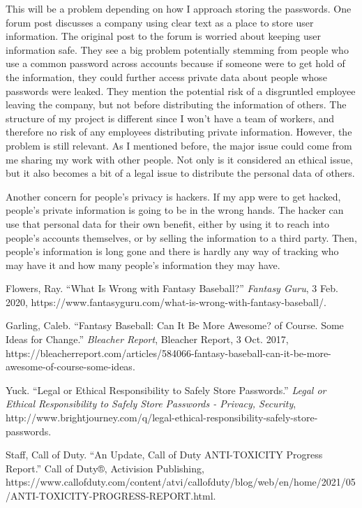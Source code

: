 \documentclass[12pt, twocolumn]{article}
\begin{document}
This will be a problem depending on how I approach storing the passwords. One forum post discusses a company using clear text as a place to store user information. The original post to the forum is worried about keeping user information safe. They see a big problem potentially stemming from people who use a common password across accounts because if someone were to get hold of the information, they could further access private data about people whose passwords were leaked. They mention the potential risk of a disgruntled employee leaving the company, but not before distributing the information of others. The structure of my project is different since I won't have a team of workers, and therefore no risk of any employees distributing private information. However, the problem is still relevant. As I mentioned before, the major issue could come from me sharing my work with other people. Not only is it considered an ethical issue, but it also becomes a bit of a legal issue to distribute the personal data of others. 

Another concern for people's privacy is hackers. If my app were to get hacked, people's private information is going to be in the wrong hands. The hacker can use that personal data for their own benefit, either by using it to reach into people's accounts themselves, or by selling the information to a third party. Then, people's information is long gone and there is hardly any way of tracking who may have it and how many people's information they may have.

\begin{thebibliography}{4}

 Flowers, Ray. “What Is Wrong with Fantasy Baseball?” \emph{Fantasy Guru}, 3 Feb. 2020, https://www.fantasyguru.com/what-is-wrong-with-fantasy-baseball/. 

 Garling, Caleb. “Fantasy Baseball: Can It Be More Awesome? of Course. Some Ideas for Change.” \emph{Bleacher Report}, Bleacher Report, 3 Oct. 2017, https://bleacherreport.com/articles/584066-fantasy-baseball-can-it-be-more-awesome-of-course-some-ideas. 

 Yuck. “Legal or Ethical Responsibility to Safely Store Passwords.” \emph{Legal or Ethical Responsibility to Safely Store Passwords - Privacy, Security}, http://www.brightjourney.com/q/legal-ethical-responsibility-safely-store-passwords. 

 Staff, Call of Duty. “An Update, Call of Duty ANTI-TOXICITY Progress Report.” Call of Duty®, Activision Publishing, https://www.callofduty.com/content/atvi/callofduty/blog/web/en/home/2021/05/ANTI-TOXICITY-PROGRESS-REPORT.html. 

\end{thebibliography}
\end{document}
